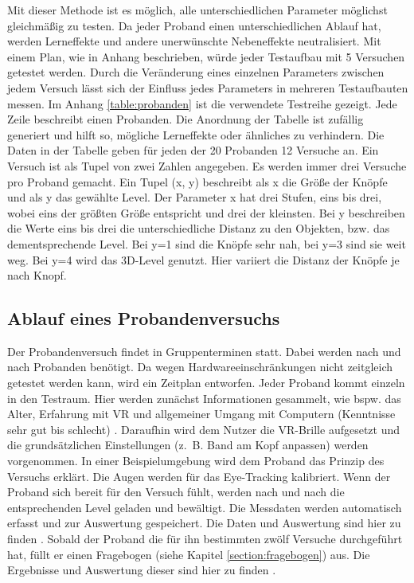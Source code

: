 Mit dieser Methode ist es möglich, alle unterschiedlichen Parameter möglichst gleichmäßig zu testen. Da jeder Proband einen unterschiedlichen Ablauf hat, werden Lerneffekte und andere unerwünschte Nebeneffekte neutralisiert. Mit einem Plan, wie in Anhang  beschrieben, würde jeder Testaufbau mit 5  Versuchen getestet werden. Durch die Veränderung eines einzelnen Parameters zwischen jedem Versuch lässt sich der Einfluss jedes Parameters in mehreren Testaufbauten messen. Im Anhang \ref{table:probanden} ist die verwendete Testreihe gezeigt. Jede Zeile beschreibt einen Probanden. Die Anordnung der Tabelle ist zufällig generiert und hilft so,  mögliche Lerneffekte oder ähnliches zu verhindern. Die Daten in der Tabelle geben für jeden der 20 Probanden 12  Versuche an. Ein Versuch ist als Tupel von zwei Zahlen angegeben. Es werden immer drei Versuche pro Proband gemacht. Ein Tupel (x, y) beschreibt als x die Größe der Knöpfe und als y das gewählte Level. Der Parameter x hat drei Stufen, eins bis drei, wobei eins der größten Größe entspricht und drei der kleinsten. Bei y beschreiben die Werte eins bis drei die unterschiedliche Distanz zu den Objekten, bzw. das dementsprechende Level. Bei y=1 sind die Knöpfe sehr nah, bei y=3 sind sie weit weg. Bei y=4 wird das 3D-Level genutzt. Hier variiert die Distanz der Knöpfe je nach Knopf. 

\subsection{Ablauf eines Probandenversuchs}
Der Probandenversuch findet in Gruppenterminen statt. Dabei werden nach und nach Probanden benötigt. Da wegen Hardwareeinschränkungen nicht zeitgleich getestet werden kann, wird ein Zeitplan entworfen. Jeder Proband kommt einzeln in den Testraum. Hier werden zunächst Informationen gesammelt, wie bspw.  das Alter, Erfahrung mit VR und allgemeiner Umgang mit Computern (Kenntnisse sehr gut bis schlecht) . Daraufhin wird dem Nutzer die VR-Brille aufgesetzt und die grundsätzlichen Einstellungen (z. B.  Band am Kopf anpassen) werden vorgenommen. In einer Beispielumgebung wird dem Proband das Prinzip des Versuchs erklärt. Die Augen werden für das Eye-Tracking kalibriert. Wenn der Proband sich bereit für den Versuch fühlt, werden nach und nach die entsprechenden Level geladen und bewältigt. Die Messdaten werden automatisch erfasst und zur Auswertung gespeichert. Die Daten und Auswertung sind hier zu finden . Sobald der Proband die für ihn bestimmten zwölf Versuche durchgeführt hat, füllt er einen Fragebogen (siehe Kapitel \ref{section:fragebogen}) aus. Die Ergebnisse und Auswertung dieser sind hier zu finden .

